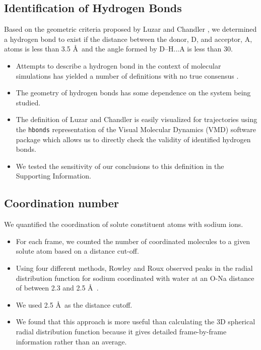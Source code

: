 \documentclass{article}
\begin{document}
  \subsection*{Identification of Hydrogen Bonds}\label{method:hbonds}

  Based on the geometric criteria proposed by Luzar and Chandler \cite{luzar_effect_1996},
  we determined a hydrogen bond to exist if the distance between the donor, D, and acceptor,
  A, atoms is less than 3.5 \AA~and the angle formed by D--H...A is less than 30\degree.
  \begin{itemize}
    \item Attempts to describe a hydrogen bond in the context of molecular simulations has
    yielded a number of definitions with no true consensus \cite{prada-gracia_quest_2013}.
	\item The geometry of hydrogen bonds has some dependence on the system being studied. 
    \item The definition of Luzar and Chandler is easily visualized for trajectories using
    the \texttt{hbonds} representation of the Visual Molecular Dynamics (VMD) software 
    package which allows us to directly check the validity of identified hydrogen bonds.
    \item We tested the sensitivity of our conclusions to this definition in 
    the Supporting Information.
  \end{itemize}

  \subsection*{Coordination number}\label{method:coordination}

  We quantified the coordination of solute constituent atoms with sodium ions.
  \begin{itemize}
  	\item For each frame, we counted the number of coordinated molecules to a
  	given solute atom based on a distance cut-off. 
  	\item Using four different methods, Rowley and Roux observed peaks in the
  	radial distribution function for sodium coordinated with water at an O-Na
  	distance of between 2.3 and 2.5 \AA~\cite{rowley_solvation_2012}. 
  	\item We used 2.5 \AA~as the distance cutoff.
  	\item We found that this approach is more useful than calculating the
	3D spherical radial distribution function because it gives detailed
	frame-by-frame information rather than an average. 
  \end{itemize}
  
\end{document}
